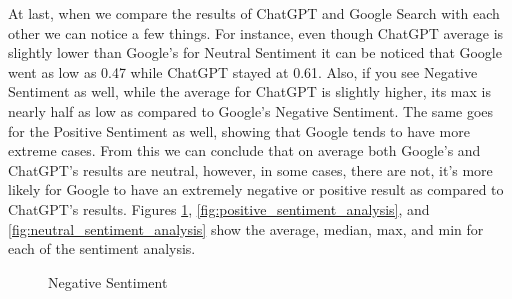 \documentclass[50pt]{usiinfbachelorproject}
\begin{document}
At last, when we compare the results of ChatGPT and Google Search with each other we can notice a few things. For instance, even though ChatGPT average is slightly lower than Google’s for Neutral Sentiment it can be noticed that Google went as low as 0.47 while ChatGPT stayed at 0.61. Also, if you see Negative Sentiment as well, while the average for ChatGPT is slightly higher, its max is nearly half as low as compared to Google's Negative Sentiment. The same goes for the Positive Sentiment as well, showing that Google tends to have more extreme cases. From this we can conclude that on average both Google’s and ChatGPT’s results are neutral, however, in some cases, there are not, it's more likely for Google to have an extremely negative or positive result as compared to ChatGPT's results. Figures \ref{fig:negative_sentiment_analysis}, \ref{fig:positive_sentiment_analysis}, and \ref{fig:neutral_sentiment_analysis} show the average, median, max, and min for each of the sentiment analysis.



\begin{figure}[H]
  \centering
  \caption{Negative Sentiment}
  \label{fig:negative_sentiment_analysis}
\end{figure}
\end{document}
